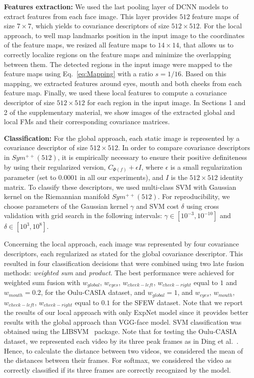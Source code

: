 \documentclass{bmvc2k}
\begin{document}
\textbf{Features extraction:}
We used the last pooling layer of DCNN models to extract features from each face image. This layer provides $512$ feature maps of size $7 \times 7$, which yields to covariance descriptors of size $512 \times 512$.
For the local approach, to well map landmarks position in the input image to the coordinates of the feature maps, we resized all feature maps to $14\times 14$, that allows us to correctly localize regions on the feature maps and minimize the overlapping between them.
The detected regions in the input image were mapped to the feature maps using Eq.~\eqref{eq:Mapping} with a ratio $s=1/16$. Based on this mapping, we extracted features around eyes, mouth and both cheeks from each feature map. Finally, we used these local features to compute a covariance descriptor of size $512 \times 512$ for each region in the input image. In Sections 1 and 2 of the supplementary material, we show images of the extracted global and local FMs and their corresponding covariance matrices. 

\textbf{Classification:}
For the global approach, each static image is represented by a covariance descriptor of size $512 \times 512$. In order to compare covariance descriptors in $Sym^{++}(512)$, it is empirically necessary to ensure their positive definiteness by using their regularized version, $C_{\Phi(f)} + \epsilon I$, where $\epsilon$ is a small regularization parameter (set to $0.0001$ in all our experiments), and $I$ is the $512 \times 512$ identity matrix.
To classify these descriptors, we used multi-class SVM with Gaussian kernel on the Riemannian manifold $Sym^{++}(512)$.
For reproducibility, we choose parameters of the Gaussian kernel $\gamma$ and SVM cost $\delta$ using cross validation with grid search in the following intervals: $\gamma \in [10^{-3}, 10^{-10}]$ and $\delta \in [10^{3}, 10^{8}]$.

Concerning the local approach, each image was represented by four covariance descriptors, each  regularized as stated for the global covariance descriptor. This resulted in four classification decisions that were combined using two late fusion methods: \textit{weighted sum} and \textit{product}. The best performance were achieved for weighted sum fusion with $w_{global}$, $w_{eyes}$, $w_{cheek-left}$, $w_{cheek-right}$ equal to $1$ and $w_{mouth}=0.2$, for the Oulu-CASIA dataset, and $w_{global}=1$, and $w_{eyes}$, $w_{mouth}$, $w_{cheek-left}$, $w_{cheek-right}$ equal to $0.1$ for the SFEW dataset. Note that we report the results of our local approach with only ExpNet model since it provides better results with the global approach than VGG-face model. SVM classification was obtained using the LIBSVM~\cite{chang2001libsvm} package.
Note that for testing the Oulu-CASIA dataset, we represented each video by its three peak frames as in Ding et al.~\cite{ding2017facenet2expnet}. Hence, to calculate the distance between two videos, we considered the mean of the distances between their frames. For softmax, we considered the video as correctly classified if its three frames are correctly recognized by the model.
\end{document}
